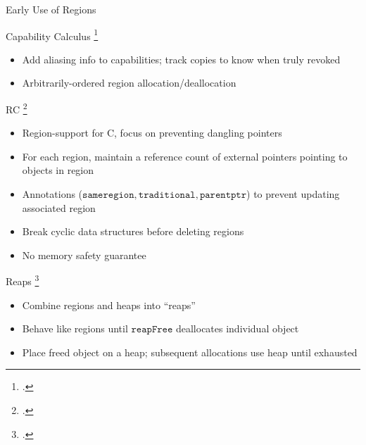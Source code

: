 \documentclass[aspectratio=169]{beamer}
\begin{document}
\begin{frame}{Early Use of Regions}
    \footnotesize{
Capability Calculus \footcite{crary_typed_1999}
    \begin{itemize}
        \item Add aliasing info to capabilities; track copies to know when truly revoked
        \item Arbitrarily-ordered region allocation/deallocation
    \end{itemize}

RC \footcite{gay_language_2001}
    \vspace{-0.1in}
   \begin{itemize}
     \item Region-support for C, focus on preventing dangling pointers %
     \item For each region, maintain a reference count of external pointers pointing to objects in region %
     \item Annotations ($\texttt{sameregion}, \texttt{traditional}, \texttt{parentptr}$) to prevent updating associated region %
     \item Break cyclic data structures before deleting regions
     \item \alert{No} memory safety guarantee
   \end{itemize}

Reaps \footcite{berger_reconsidering_2002}
    \vspace{-0.1in}
   \begin{itemize}
     \item Combine regions and heaps into ``reaps''
     \item Behave like regions until $\texttt{reapFree}$ deallocates individual object
     \item Place freed object on a heap; subsequent allocations use heap until exhausted
   \end{itemize}
}
    \vspace{0.2in}
\end{frame}
\end{document}
